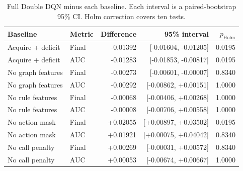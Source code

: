 \begin{table}[t]
\centering
\caption{Full Double DQN minus each baseline. Each interval is a paired-bootstrap 95\% CI. Holm correction covers ten tests.}
\label{tab:offline_tests}
\footnotesize
\setlength{\tabcolsep}{3pt}
\begin{tabular*}{\textwidth}{@{\extracolsep{\fill}}llrrr@{}}
\toprule
Baseline & Metric & Difference & 95\% interval & $p_{\mathrm{Holm}}$ \\
\midrule
Acquire + deficit & Final & -0.01392 & [-0.01604, -0.01205] & 0.0195 \\
Acquire + deficit & AUC & -0.01283 & [-0.01853, -0.00817] & 0.0195 \\
No graph features & Final & -0.00273 & [-0.00601, -0.00007] & 0.8340 \\
No graph features & AUC & -0.00292 & [-0.00862, +0.00151] & 1.0000 \\
No rule features & Final & -0.00068 & [-0.00406, +0.00268] & 1.0000 \\
No rule features & AUC & -0.00008 & [-0.00706, +0.00558] & 1.0000 \\
No action mask & Final & +0.02055 & [+0.00897, +0.03502] & 0.0195 \\
No action mask & AUC & +0.01921 & [+0.00075, +0.04042] & 0.8340 \\
No call penalty & Final & +0.00269 & [-0.00031, +0.00572] & 0.8340 \\
No call penalty & AUC & +0.00053 & [-0.00674, +0.00667] & 1.0000 \\
\bottomrule
\end{tabular*}
\end{table}

